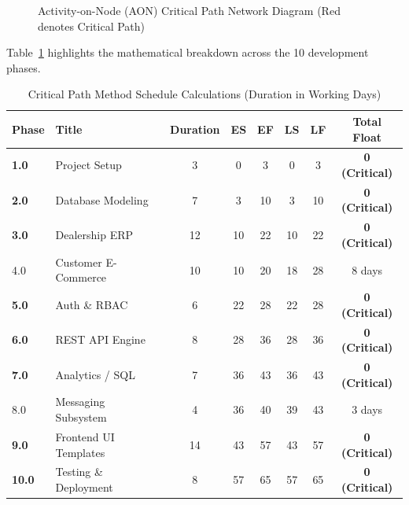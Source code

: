 \begin{figure}[H]
{%
}
\caption{Activity-on-Node (AON) Critical Path Network Diagram (Red denotes Critical Path)}
\label{fig:cpm_diagram}
\end{figure}

Table~\ref{tab:cpm_schedule} highlights the mathematical breakdown across the 10 development phases.

\begin{table}[H]
\centering
\small
\renewcommand{\arraystretch}{1.3}
\begin{tabular}{@{}llcccccc@{}}
\toprule
\textbf{Phase} & \textbf{Title} & \textbf{Duration} & \textbf{ES} & \textbf{EF} & \textbf{LS} & \textbf{LF} & \textbf{Total Float} \\
\midrule
\textbf{1.0} & Project Setup & 3 & 0 & 3 & 0 & 3 & \textbf{0 (Critical)} \\
\textbf{2.0} & Database Modeling & 7 & 3 & 10 & 3 & 10 & \textbf{0 (Critical)} \\
\textbf{3.0} & Dealership ERP & 12 & 10 & 22 & 10 & 22 & \textbf{0 (Critical)} \\
4.0 & Customer E-Commerce & 10 & 10 & 20 & 18 & 28 & 8 days \\
\textbf{5.0} & Auth \& RBAC & 6 & 22 & 28 & 22 & 28 & \textbf{0 (Critical)} \\
\textbf{6.0} & REST API Engine & 8 & 28 & 36 & 28 & 36 & \textbf{0 (Critical)} \\
\textbf{7.0} & Analytics / SQL & 7 & 36 & 43 & 36 & 43 & \textbf{0 (Critical)} \\
8.0 & Messaging Subsystem & 4 & 36 & 40 & 39 & 43 & 3 days \\
\textbf{9.0} & Frontend UI Templates & 14 & 43 & 57 & 43 & 57 & \textbf{0 (Critical)} \\
\textbf{10.0} & Testing \& Deployment & 8 & 57 & 65 & 57 & 65 & \textbf{0 (Critical)} \\
\bottomrule
\end{tabular}
\caption{Critical Path Method Schedule Calculations (Duration in Working Days)}
\label{tab:cpm_schedule}
\end{table}

